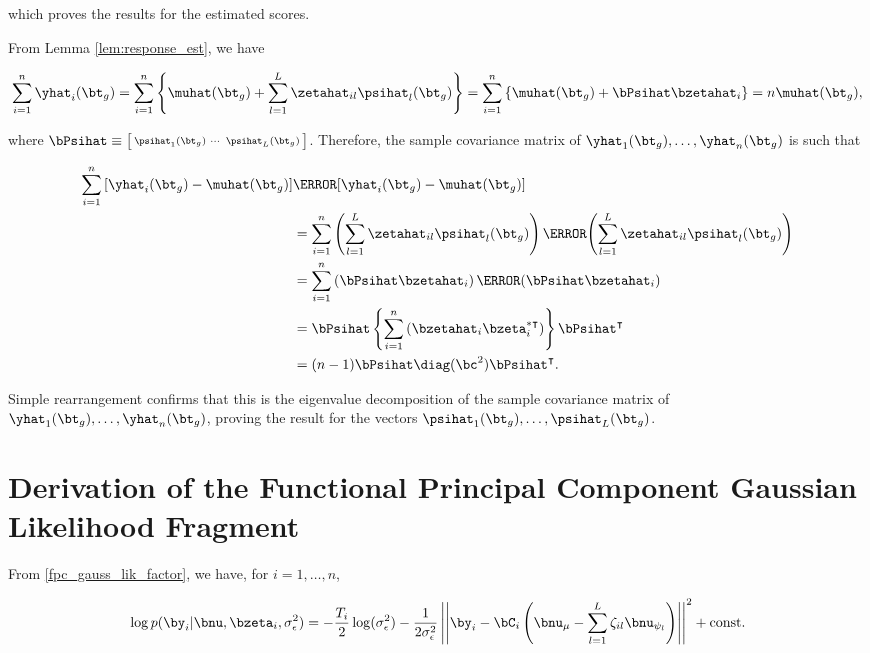\documentclass[12pt]{article}
\def\sigsqeps{\sigma^2_{\epsilon}}
\def\const{\text{const.}}
\def\numu{\bnu_\mu}
\newcommand\nupsi[1]{\bnu_{\psi_{#1}}}
\theoremstyle{plain}
\theoremstyle{definition}
\theoremstyle{remark}
\begin{document}
\noindent which proves the results for the estimated scores.

From Lemma \ref{lem:response_est}, we have

\[
	\sum_{i=1}^n \yhat_i (\bt_g)
		= \sum_{i=1}^n \left\{ \muhat (\bt_g) + \sum_{l=1}^L \zetahat_{il} \psihat_l (\bt_g) \right\}
		= \sum_{i=1}^n \left\{ \muhat (\bt_g) + \bPsihat \bzetahat_i \right\}
		= n \muhat (\bt_g),
\]

\noindent where $\bPsihat \equiv \bigl[ \begin{smallmatrix} \psihat_1 (\bt_g) & \cdots & \psihat_L (\bt_g)
\end{smallmatrix} \bigr]$.
Therefore, the sample covariance matrix of $\yhat_1 (\bt_g), \dots, \yhat_n (\bt_g)$ is such that

\begin{align*}
	\sum_{i=1}^n \left[ \yhat_i (\bt_g) - \muhat (\bt_g) \right] & \T{\left[ \yhat_i (\bt_g) - \muhat (\bt_g) \right]} \\
		&= \sum_{i=1}^n \left(
			\sum_{l=1}^L \zetahat_{il} \psihat_l (\bt_g)
		\right) \T{\left(
			\sum_{l=1}^L \zetahat_{il} \psihat_l (\bt_g)
		\right)} \\
		&= \sum_{i=1}^n \left( \bPsihat \bzetahat_i \right) \T{\left( \bPsihat \bzetahat_i \right)} \\
		&= \bPsihat \left\{ \sum_{i=1}^n \left( \bzetahat_i \bzeta^{*\intercal}_i \right) \right\} \bPsihat^{\intercal} \\
		&= (n - 1) \bPsihat \diag (\bc^2) \bPsihat^{\intercal}.
\end{align*}

\noindent Simple rearrangement confirms that this is the eigenvalue decomposition of
the sample covariance matrix of $\yhat_1 (\bt_g), \dots, \yhat_n (\bt_g)$, proving the result for the vectors
$\psihat_1 (\bt_g), \dots, \psihat_L (\bt_g)$.


\section{Derivation of the Functional Principal Component Gaussian Likelihood Fragment}
\label{app:fpca_gauss_lik_frag}

From \eqref{fpc_gauss_lik_factor}, we have, for $i = 1, \dots, n$, 

\begin{equation}
	\log p (\by_i | \bnu, \bzeta_i, \sigsqeps) =
		-\frac{T_i}{2} \log (\sigsqeps)
		- \frac{1}{2\sigsqeps} \left|\left|
			\by_i - \bC_i \left( \numu - \sum_{l=1}^L \zeta_{il} \nupsi{l} \right)
		\right|\right|^2
		+ \const
\label{log_fpc_gauss_lik_factor}
\end{equation}
\end{document}
